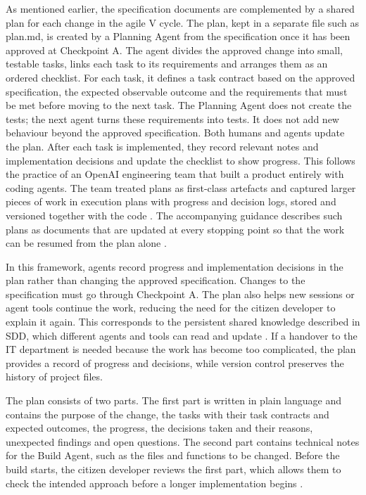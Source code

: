 \documentclass[10pt,a4paper]{article}
\begin{document}
As mentioned earlier, the specification documents are complemented by a shared plan for each change in the agile V cycle. The plan, kept in a separate file such as plan.md, is created by a Planning Agent from the specification once it has been approved at Checkpoint A. The agent divides the approved change into small, testable tasks, links each task to its requirements and arranges them as an ordered checklist. For each task, it defines a task contract based on the approved specification, the expected observable outcome and the requirements that must be met before moving to the next task. The Planning Agent does not create the tests; the next agent turns these requirements into tests. It does not add new behaviour beyond the approved specification.
Both humans and agents update the plan. After each task is implemented, they record relevant notes and implementation decisions and update the checklist to show progress. This follows the practice of an OpenAI engineering team that built a product entirely with coding agents. The team treated plans as first-class artefacts and captured larger pieces of work in execution plans with progress and decision logs, stored and versioned together with the code \parencite{lopopolo2026HarnessEngineering}. The accompanying guidance describes such plans as documents that are updated at every stopping point so that the work can be resumed from the plan alone \parencite{friel2025}.

In this framework, agents record progress and implementation decisions in the plan rather than changing the approved specification. Changes to the specification must go through Checkpoint A. The plan also helps new sessions or agent tools continue the work, reducing the need for the citizen developer to explain it again. This corresponds to the persistent shared knowledge described in SDD, which different agents and tools can read and update \parencite{diaz2026}. If a handover to the IT department is needed because the work has become too complicated, the plan provides a record of progress and decisions, while version control preserves the history of project files.

The plan consists of two parts. The first part is written in plain language and contains the purpose of the change, the tasks with their task contracts and expected outcomes, the progress, the decisions taken and their reasons, unexpected findings and open questions. The second part contains technical notes for the Build Agent, such as the files and functions to be changed. Before the build starts, the citizen developer reviews the first part, which allows them to check the intended approach before a longer implementation begins \parencite{friel2025}. 
\end{document}
